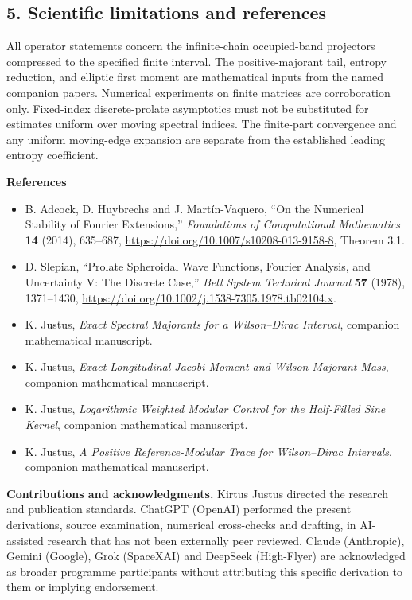 \documentclass[
  10pt,
  a4paper,
]{article}
\providecommand{\tightlist}{%
  \setlength{\itemsep}{0pt}\setlength{\parskip}{0pt}}
\begin{document}
\subsection{5. Scientific limitations and references}\label{scientific-limitations-and-references}

All operator statements concern the infinite-chain occupied-band projectors compressed to the specified finite interval. The positive-majorant tail, entropy reduction, and elliptic first moment are mathematical inputs from the named companion papers. Numerical experiments on finite matrices are corroboration only. Fixed-index discrete-prolate asymptotics must not be substituted for estimates uniform over moving spectral indices. The finite-part convergence and any uniform moving-edge expansion are separate from the established leading entropy coefficient.

\newpage

\textbf{References}

\begin{itemize}
\tightlist
\item
  B. Adcock, D. Huybrechs and J. Martín-Vaquero, ``On the Numerical Stability of Fourier Extensions,'' \emph{Foundations of Computational Mathematics} \textbf{14} (2014), 635--687, \url{https://doi.org/10.1007/s10208-013-9158-8}, Theorem 3.1.
\item
  D. Slepian, ``Prolate Spheroidal Wave Functions, Fourier Analysis, and Uncertainty V: The Discrete Case,'' \emph{Bell System Technical Journal} \textbf{57} (1978), 1371--1430, \url{https://doi.org/10.1002/j.1538-7305.1978.tb02104.x}.
\item
  K. Justus, \emph{Exact Spectral Majorants for a Wilson--Dirac Interval}, companion mathematical manuscript.
\item
  K. Justus, \emph{Exact Longitudinal Jacobi Moment and Wilson Majorant Mass}, companion mathematical manuscript.
\item
  K. Justus, \emph{Logarithmic Weighted Modular Control for the Half-Filled Sine Kernel}, companion mathematical manuscript.
\item
  K. Justus, \emph{A Positive Reference-Modular Trace for Wilson--Dirac Intervals}, companion mathematical manuscript.
\end{itemize}

\textbf{Contributions and acknowledgments.} Kirtus Justus directed the research and publication standards. ChatGPT (OpenAI) performed the present derivations, source examination, numerical cross-checks and drafting, in AI-assisted research that has not been externally peer reviewed. Claude (Anthropic), Gemini (Google), Grok (SpaceXAI) and DeepSeek (High-Flyer) are acknowledged as broader programme participants without attributing this specific derivation to them or implying endorsement.
\end{document}
